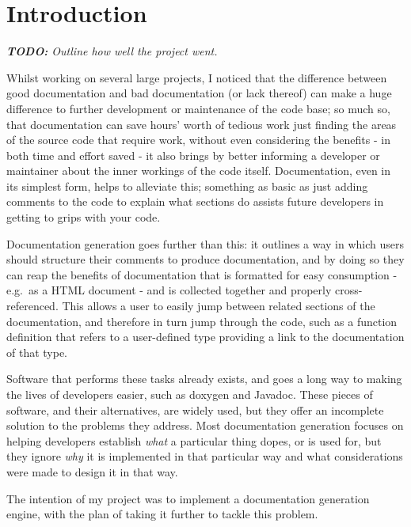 
\chapter{Introduction}

\emph{\textbf{TODO:} Outline how well the project went.}

Whilst working on several large projects, I noticed that the difference between
good documentation and bad documentation (or lack thereof) can make a huge
difference to further development or maintenance of the code base; so much so,
that documentation can save hours' worth of tedious work just finding the areas
of the source code that require work, without even considering the benefits -
in both time and effort saved - it also brings by better informing a developer
or maintainer about the inner workings of the code itself. Documentation, even
in its simplest form, helps to alleviate this; something as basic as just adding
comments to the code to explain what sections do assists future developers in
getting to grips with your code.

Documentation generation goes further than this: it outlines a way in which
users should structure their comments to produce documentation, and by doing so
they can reap the benefits of documentation that is formatted for easy
consumption - e.g.~as a HTML document - and is collected together and properly
cross-referenced. This allows a user to easily jump between related sections of
the documentation, and therefore in turn jump through the code, such as a
function definition that refers to a user-defined type providing a link to the
documentation of that type.

Software that performs these tasks already exists, and goes a long way to making
the lives of developers easier, such as doxygen\cite{website:doxygen} and
Javadoc\cite{website:javadoc}. These pieces of software, and their alternatives,
are widely used, but they offer an incomplete solution to the problems they
address. Most documentation generation focuses on helping developers establish
\emph{what} a particular thing dopes, or is used for, but they ignore \emph{why}
it is implemented in that particular way and what considerations were made to
design it in that way.

The intention of my project was to implement a documentation generation engine,
with the plan of taking it further to tackle this problem.

